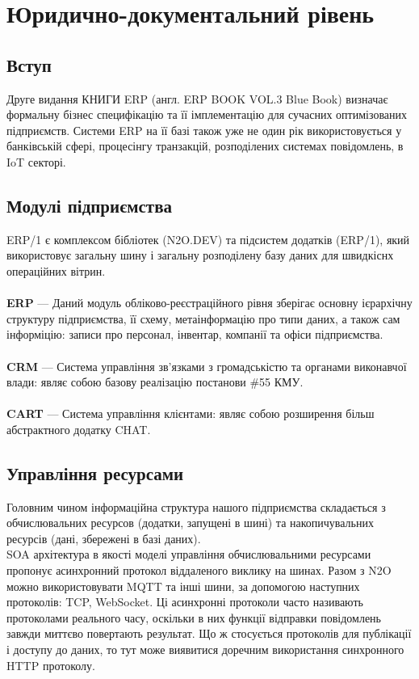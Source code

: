 \chapter{Юридично-документальний рівень}

\section{Вступ}

Друге видання КНИГИ ERP (англ. ERP BOOK VOL.3 Blue Book) визначає формальну
бізнес специфікацію та її імплементацію для сучасних оптимізованих підприємств.
Системи ERP на її базі також уже не один рік використовується у банківській сфері,
процесінгу транзакцій, розподілених системах повідомлень, в IoT секторі.

\section{Модулі підприємства}

ERP/1 є комплексом бібліотек (N2O.DEV) та підсистем додатків (ERP/1),
який використовує загальну шину і загальну розподілену базу даних для швидкіснх операційних вітрин.
\\
\\
\textbf{ERP} — Даний модуль обліково-реєстраційного рівня зберігає основну ієрархічну структуру
        підприємства, її схему, метаінформацію про типи даних, а також сам інформіцію:
        записи про персонал, інвентар, компанії та офіси підприємства.
\\
\\
\textbf{CRM} — Система управління зв'язками з громадськістю та органами виконавчої влади:
        являє собою базову реалізацію постанови \#55 КМУ.
\\
\\
\textbf{CART} — Система управління клієнтами: являє собою розширення більш
           абстрактного додатку CHAT.

\section{Управління ресурсами}

Головним чином інформаційна структура нашого підприємства
складається з обчислювальних ресурсов (додатки, запущені в шині)
та накопичувальних ресурсів (дані, збережені в базі даних).
\
\\
SOA архітектура в якості моделі управління обчислювальними
ресурсами пропонує асинхронний протокол віддаленого виклику на шинах.
Разом з N2O можно використовувати MQTT та інші шини, за допомогою наступних протоколів: TCP, WebSocket.
Ці асинхронні протоколи часто називають
протоколами реального часу, оскільки в них функції відправки повідомлень завжди
миттєво повертають результат. Що ж стосується протоколів для публікації і доступу
до даних, то тут може виявитися доречним використання синхронного HTTP протоколу.

